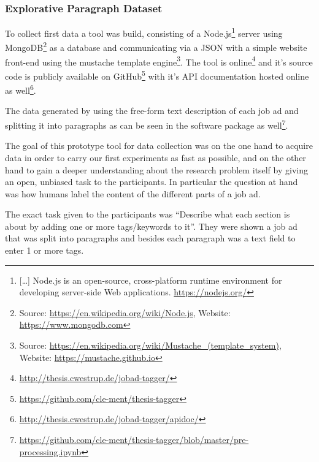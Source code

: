\subsubsection{Explorative Paragraph Dataset}


To collect first data a tool was build, consisting of a Node.js\footnote{[\ldots] Node.js is an open-source, cross-platform runtime environment for developing server-side Web applications. \url{https://nodejs.org/}} server using MongoDB\footnote{ Source: \url{https://en.wikipedia.org/wiki/Node.js}, Website: \url{https://www.mongodb.com}} as a database and communicating via a JSON with a simple website front-end using the mustache template engine\footnote{ Source: \url{https://en.wikipedia.org/wiki/Mustache_(template_system)}, Website: \url{https://mustache.github.io}}.
The tool is online\footnote{\url{http://thesis.cwestrup.de/jobad-tagger/}} and it's source code is publicly available on GitHub\footnote{\url{https://github.com/cle-ment/thesis-tagger}} with it's API documentation hosted online as well\footnote{\url{http://thesis.cwestrup.de/jobad-tagger/apidoc/}}.

The data generated by using the free-form text description of each job ad and splitting it into paragraphs as can be seen in the software package as well\footnote{\url{https://github.com/cle-ment/thesis-tagger/blob/master/pre-processing.ipynb}}.

The goal of this prototype tool for data collection was on the one hand to acquire data in order to carry our first experiments as fast as possible, and on the other hand to gain a deeper understanding about the research problem itself by giving an open, unbiased task to the participants. In particular the question at hand was how humans label the content of the different parts of a job ad.

The exact task given to the participants was ``Describe what each section is about by adding one or more tags/keywords to it''. They were shown a job ad that was split into paragraphs and besides each paragraph was a text field to enter 1 or more tags.

